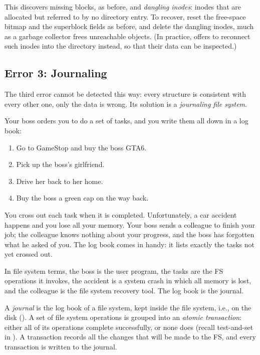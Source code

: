 This discovers missing blocks, as before, and \emph{dangling inodes}: inodes that are allocated but referred to by no directory entry. To recover, reset the free-space bitmap and the superblock fields as before, and delete the dangling inodes, much as a garbage collector frees unreachable objects. (In practice,  offers to reconnect such inodes into the directory  instead, so that their data can be inspected.)

\subsection{Error 3: Journaling}

The third error cannot be detected this way: every structure is consistent with every other one, only the data is wrong. Its solution is a \emph{journaling file system}.

\begin{example}
  Your boss orders you to do a set of tasks, and you write them all down in a log book:
  \begin{enumerate}
    \item Go to GameStop and buy the boss GTA6.
    \item Pick up the boss's girlfriend.
    \item Drive her back to her home.
    \item Buy the boss a green cap on the way back.
  \end{enumerate}
  You cross out each task when it is completed. Unfortunately, a car accident happens and you lose all your memory. Your boss sends a colleague to finish your job; the colleague knows nothing about your progress, and the boss has forgotten what he asked of you. The log book comes in handy: it lists exactly the tasks not yet crossed out.

  In file system terms, the boss is the user program, the tasks are the FS operations it invokes, the accident is a system crash in which all memory is lost, and the colleague is the file system recovery tool. The log book is the journal.
\end{example}

\begin{definition}
  A \emph{journal} is the log book of a file system, kept inside the file system, i.e., on the disk (). A set of file system operations is grouped into an \emph{atomic transaction}: either all of its operations complete successfully, or none does (recall test-and-set in ). A transaction records all the changes that will be made to the FS, and every transaction is written to the journal.
\end{definition}

